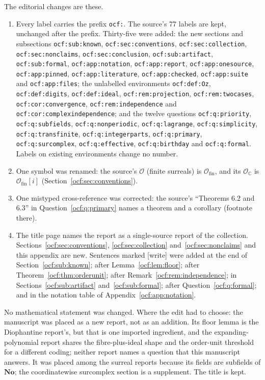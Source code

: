 \documentclass[11pt,a4paper]{article}
\numberwithin{equation}{section}
\theoremstyle{definition}
\theoremstyle{remark}
\newcommand{\No}{\mathbf{No}}
\newcommand{\C}{\mathbb C}
\newcommand{\Ofin}{\mathcal O_{\mathrm{fin}}}%
\newcommand{\lbl}[1]{\nolinkurl{#1}}%
\newcommand{\wtag}{\textup{[write]}}%
\begin{document}
The editorial changes are these.
\begin{enumerate}[label=(\arabic*)]
\item Every label carries the prefix \texttt{ocf:}. The source's 77 labels
are kept, unchanged after the prefix. Thirty-five were added: the new
sections and subsections \lbl{ocf:sub:known}, \lbl{ocf:sec:conventions},
\lbl{ocf:sec:collection}, \lbl{ocf:sec:nonclaims}, \lbl{ocf:sec:conclusion},
\lbl{ocf:sub:artifact}, \lbl{ocf:sub:formal}, \lbl{ocf:app:notation},
\lbl{ocf:app:report}, \lbl{ocf:app:onesource}, \lbl{ocf:app:pinned},
\lbl{ocf:app:literature}, \lbl{ocf:app:checked}, \lbl{ocf:app:suite} and
\lbl{ocf:app:files}; the unlabelled environments \lbl{ocf:def:Oz},
\lbl{ocf:def:digits}, \lbl{ocf:def:ideal}, \lbl{ocf:rem:projection},
\lbl{ocf:rem:twocases}, \lbl{ocf:cor:convergence},
\lbl{ocf:rem:independence} and \lbl{ocf:cor:complexindependence}; and the
twelve questions \lbl{ocf:q:priority}, \lbl{ocf:q:subfields},
\lbl{ocf:q:nonperiodic}, \lbl{ocf:q:lagrange}, \lbl{ocf:q:simplicity},
\lbl{ocf:q:transfinite}, \lbl{ocf:q:integerparts}, \lbl{ocf:q:primary},
\lbl{ocf:q:surcomplex}, \lbl{ocf:q:effective}, \lbl{ocf:q:birthday} and
\lbl{ocf:q:formal}. Labels on existing environments change no number.
\item One symbol was renamed: the source's $\mathcal O$ (finite surreals) is
$\Ofin$, and its $\mathcal O_\C$ is $\Ofin[i]$
(Section~\ref{ocf:sec:conventions}).
\item One mistyped cross-reference was corrected: the source's
``Theorems 6.2 and 6.3'' in Question~\ref{ocf:q:primary} names a theorem
and a corollary (footnote there).
\item The title page names the report as a single-source report of the
collection. Sections~\ref{ocf:sec:conventions}, \ref{ocf:sec:collection}
and~\ref{ocf:sec:nonclaims} and this appendix are new. Sentences marked
\wtag{} were added at the end of Section~\ref{ocf:sub:known}; after
Lemma~\ref{ocf:lem:floor}; after Theorem~\ref{ocf:thm:orderunit}; after
Remark~\ref{ocf:rem:independence}; in
Sections~\ref{ocf:sub:artifact} and~\ref{ocf:sub:formal}; after
Question~\ref{ocf:q:formal}; and in the notation table of
Appendix~\ref{ocf:app:notation}.
\end{enumerate}
No mathematical statement was changed. Where the edit had to choose: the
manuscript was placed as a new report, not as an addition. Its floor
lemma is the Diophantine report's, but that is one imported ingredient,
and the expanding-polynomial report shares the fibre-plus-ideal shape and
the order-unit threshold for a different coding; neither report names a
question that this manuscript answers. It was placed among the surreal
reports because its fields are subfields of $\No$; the coordinatewise
surcomplex section is a supplement. The title is kept.
\end{document}

